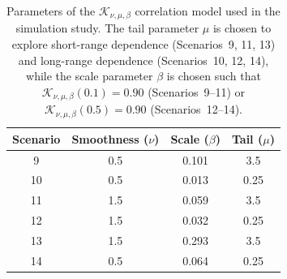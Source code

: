\documentclass[
  12pt]{article}
\begin{document}
\begin{table}[htbp]
\centering
\caption{Parameters of the $\mathcal{K}_{\nu,\mu,\beta}$ correlation model used in the simulation study. The tail parameter $\mu$ is chosen to explore short-range dependence (Scenarios~9, 11, 13) and long-range dependence (Scenarios~10, 12, 14), while the scale parameter $\beta$ is chosen such that $\mathcal{K}_{\nu,\mu,\beta}(0.1)=0.90$ (Scenarios~9--11) or $\mathcal{K}_{\nu,\mu,\beta}(0.5)=0.90$ (Scenarios~12--14).}
\begin{tabular}{|c|c|c|c|}
\hline
\textbf{Scenario} & \textbf{Smoothness ($\nu$)} & \textbf{Scale ($\beta$)} & \textbf{Tail ($\mu$)} \\
\hline
9  & 0.5 & 0.101 & 3.5 \\
\hline
10 & 0.5 & 0.013 & 0.25 \\
\hline
11 & 1.5 & 0.059 & 3.5 \\
\hline
12 & 1.5 & 0.032 & 0.25 \\
\hline
13 & 1.5 & 0.293 & 3.5 \\
\hline
14 & 0.5 & 0.064 & 0.25 \\
\hline
\end{tabular}
\label{tab:tabla3}
\end{table}
\end{document}
